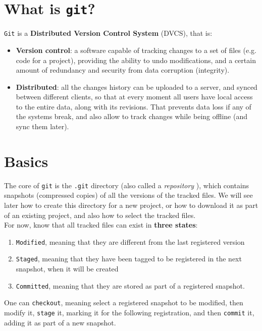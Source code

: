 \documentclass[../template.tex]{subfiles}
\begin{document}
\section{What is \texttt{git}?}
\texttt{Git} is a \textbf{Distributed Version Control System} (DVCS), that is:
\begin{itemize}
    \item \textbf{Version control}: a software capable of tracking changes to a set of files (e.g. code for a project), providing the ability to undo modifications, and a certain amount of redundancy and security from data corruption (integrity).
    \item \textbf{Distributed}: all the changes history can be uploaded to a server, and synced between different clients, so that at every moment all users have local access to the entire data, along with its revisions. That prevents data loss if any of the systems break, and also allow to track changes while being offline (and sync them later). 
\end{itemize}
 
\section{Basics}
The core of \texttt{git} is the \texttt{.git} directory (also called a \textit{repository} ), which contains snapshots (compressed copies) of all the versions of the tracked files. We will see later how to create this directory for a new project, or how to download it as part of an existing project, and also how to select the tracked files.\\

For now, know that all tracked files can exist in \textbf{three states}:
\begin{enumerate}
    \item \texttt{Modified}, meaning that they are different from the last registered version
    \item \texttt{Staged}, meaning that they have been tagged to be registered in the next snapshot, when it will be created
    \item \texttt{Committed}, meaning that they are stored as part of a registered snapshot. 
\end{enumerate}
One can \texttt{checkout}, meaning select a registered snapshot to be modified, then modify it, \texttt{stage} it, marking it for the following registration, and then \texttt{commit} it, adding it as part of a new snapshot.
\end{document}
